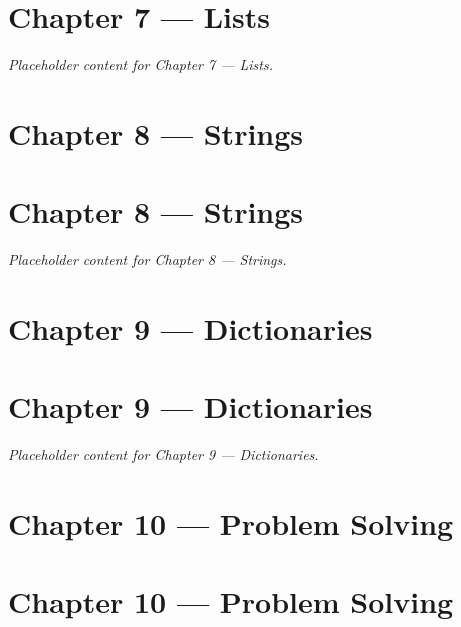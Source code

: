 \documentclass[
  letterpaper,
  DIV=11,
  numbers=noendperiod]{scrreprt}
\begin{document}
\chapter*{Chapter 7 --- Lists}\label{chapter-7-lists-1}


\emph{Placeholder content for Chapter 7 --- Lists.}

\chapter{Chapter 8 --- Strings}\label{chapter-8-strings}

\chapter*{Chapter 8 --- Strings}\label{chapter-8-strings-1}


\emph{Placeholder content for Chapter 8 --- Strings.}

\chapter{Chapter 9 --- Dictionaries}\label{chapter-9-dictionaries}

\chapter*{Chapter 9 --- Dictionaries}\label{chapter-9-dictionaries-1}


\emph{Placeholder content for Chapter 9 --- Dictionaries.}

\chapter{Chapter 10 --- Problem
Solving}\label{chapter-10-problem-solving}

\chapter*{Chapter 10 --- Problem
Solving}\label{chapter-10-problem-solving-1}
\end{document}
